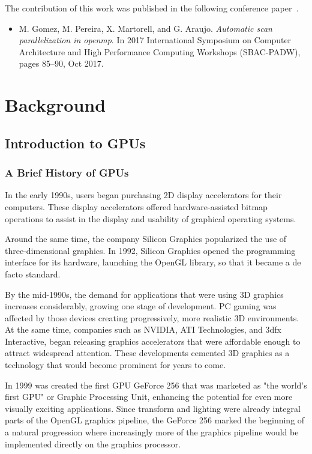 \documentclass[Ingles]{ic-tese-v1}
\begin{document}
The contribution of this work was published in the following conference paper~\cite{maicol2017}.

\begin{itemize}
  \item M. Gomez, M. Pereira, X. Martorell, and G. Araujo. {\em Automatic scan
    parallelization in openmp}. In 2017 International Symposium on Computer
    Architecture and High Performance Computing Workshops (SBAC-PADW), pages
    85–90, Oct 2017.
\end{itemize}

\chapter{Background}
\label{cap:background}

\section{Introduction to GPUs}
\subsection{A Brief History of GPUs}
In the early 1990s, users began purchasing
2D display accelerators for their computers. These display accelerators
offered hardware-assisted bitmap operations to assist in the display and usability
of graphical operating systems.

Around the same time, the company Silicon Graphics popularized the use
of three-dimensional graphics. In 1992, Silicon Graphics opened the
programming interface for its hardware, launching the OpenGL library, so that it became a de facto standard.

By the mid-1990s, the demand for applications that were using 3D graphics
increases considerably, growing one stage of development. PC gaming was affected
by those devices creating progressively, more realistic 3D environments.
At the same time, companies such as NVIDIA, ATI Technologies,
and 3dfx Interactive, began releasing graphics accelerators that were affordable
enough to attract widespread attention. These developments cemented 3D
graphics as a technology that would become prominent for years to come.

In 1999 was created the first GPU GeForce 256 that was marketed as "the world's
first GPU" or Graphic Processing Unit, enhancing the potential
for even more visually exciting applications. Since transform and lighting were
already integral parts of the OpenGL graphics pipeline, the GeForce 256 marked
the beginning of a natural progression where increasingly more of the graphics
pipeline would be implemented directly on the graphics processor.
\end{document}

